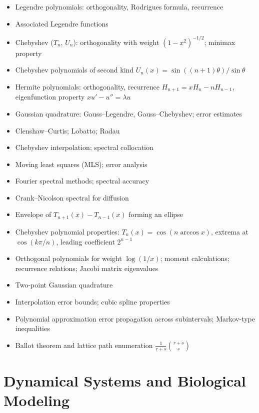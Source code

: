 \documentclass{amsart}
\begin{document}
\begin{itemize}
  \item Legendre polynomials: orthogonality, Rodrigues formula, recurrence
  \item Associated Legendre functions
  \item Chebyshev ($T_n$, $U_n$): orthogonality with weight $(1-x^2)^{-1/2}$; minimax property
  \item Chebyshev polynomials of second kind $U_n(x) = \sin((n+1)\theta)/\sin\theta$
  \item Hermite polynomials: orthogonality, recurrence $H_{n+1} = xH_n - nH_{n-1}$, eigenfunction property $xu' - u'' = \lambda u$
  \item Gaussian quadrature: Gauss--Legendre, Gauss--Chebyshev; error estimates
  \item Clenshaw--Curtis; Lobatto; Radau
  \item Chebyshev interpolation; spectral collocation
  \item Moving least squares (MLS); error analysis
  \item Fourier spectral methods; spectral accuracy
  \item Crank--Nicolson spectral for diffusion
  \item Envelope of $T_{n+1}(x) - T_{n-1}(x)$ forming an ellipse
  \item Chebyshev polynomial properties: $T_n(x) = \cos(n\arccos x)$, extrema at $\cos(k\pi/n)$, leading coefficient $2^{n-1}$
  \item Orthogonal polynomials for weight $\log(1/x)$; moment calculations; recurrence relations; Jacobi matrix eigenvalues
  \item Two-point Gaussian quadrature
  \item Interpolation error bounds; cubic spline properties
  \item Polynomial approximation error propagation across subintervals; Markov-type inequalities
  \item Ballot theorem and lattice path enumeration $\frac{1}{r+s}\binom{r+s}{s}$
\end{itemize}

\section{Dynamical Systems and Biological Modeling}
\end{document}
